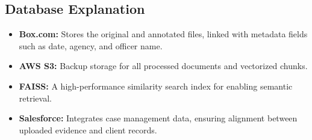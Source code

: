 \documentclass[11pt]{article}
\begin{document}
\subsection{Database Explanation}
\begin{itemize}
\item \textbf{Box.com:} Stores the original and annotated files, linked with metadata fields such as date, agency, and officer name.
\item \textbf{AWS S3:} Backup storage for all processed documents and vectorized chunks.
\item \textbf{FAISS:} A high-performance similarity search index for enabling semantic retrieval.
\item \textbf{Salesforce:} Integrates case management data, ensuring alignment between uploaded evidence and client records.
\end{itemize}

\newpage
\end{document}
